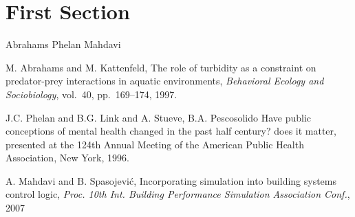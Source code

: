\documentclass{article}
\begin{document}
\section{First Section}
\nocite{*}

Abrahams \cite{abrahams1997role} Phelan \cite{phelan1996have} Mahdavi \cite{mahdavi2007incorporating}

\begin{thebibliography}{1}

 M. Abrahams and M. Kattenfeld, The role of turbidity as a constraint on predator-prey interactions in aquatic environments, {\em Behavioral Ecology and Sociobiology}, vol.~40, pp.~169--174, 1997. 

 J.C. Phelan and B.G. Link and A. Stueve, B.A. Pescosolido Have public conceptions of mental health changed in the past half century? does it matter, presented at the 124th Annual Meeting of the American Public Health Association, New York, 1996. 

 A. Mahdavi and B. Spasojevi{\'c}, Incorporating simulation into building systems control logic, {\em Proc. 10th Int. Building Performance Simulation Association Conf.}, 2007 



\end{thebibliography}

% 




\end{document}
